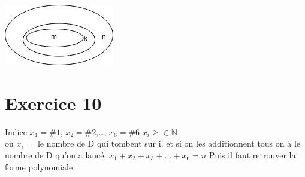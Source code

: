 \documentclass[fontsize=10pt]{article}
\begin{document}
\includegraphics[scale=1]{TP6Exo9.jpg} 

\section*{Exercice 10}
Indice 
$x_1 = \#1$, $x_2 = \#2$,\dots, $x_6 = \#6$ \hspace{1cm} $x_i \geq \in \mathbb{N}$ \\
où $x_i =$ le nombre de D qui tombent sur i. et si on les additionnent tous on à le nombre de D qu'on a lancé.
$x_1 + x_2 +x_3 + \dots + x_6 =n$
Puis il faut retrouver la forme polynomiale.
\end{document}
